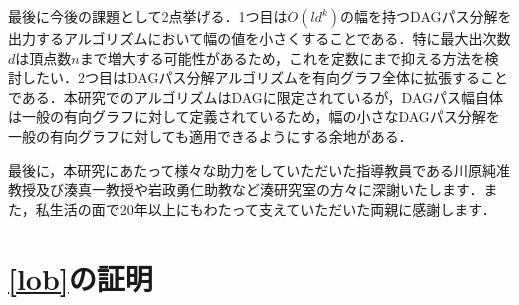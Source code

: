 \documentclass[master]{kuisthesis}		%
\theoremstyle{plain}
\theoremstyle{definition}
\begin{document}
最後に今後の課題として2点挙げる．1つ目は$O(ld^k)$の幅を持つDAGパス分解を出力するアルゴリズムにおいて幅の値を小さくすることである．特に最大出次数$d$は頂点数$n$まで増大する可能性があるため，これを定数にまで抑える方法を検討したい．2つ目はDAGパス分解アルゴリズムを有向グラフ全体に拡張することである．本研究でのアルゴリズムはDAGに限定されているが，DAGパス幅自体は一般の有向グラフに対して定義されているため，幅の小さなDAGパス分解を一般の有向グラフに対しても適用できるようにする余地がある．
















\acknowledgments				%
最後に，本研究にあたって様々な助力をしていただいた指導教員である川原純准教授及び湊真一教授や岩政勇仁助教など湊研究室の方々に深謝いたします．また，私生活の面で20年以上にもわたって支えていただいた両親に感謝します．

\nocite{*}








\Appendix[付録]



\section{\ref{lob}の証明}
   
\end{document}
